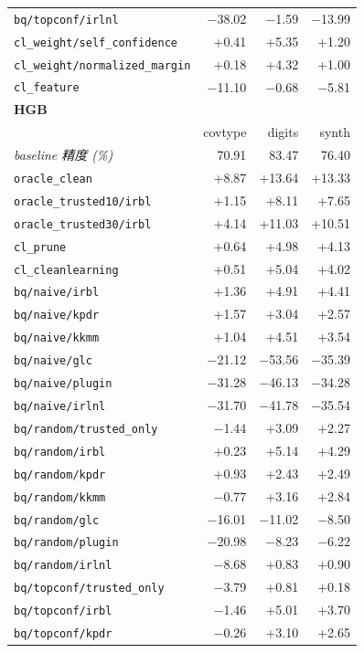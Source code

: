 \begin{tabular}{lrrr}
\texttt{bq/topconf/irlnl} & $-$38.02 & $-$1.59 & $-$13.99 \\
\texttt{cl\_weight/self\_confidence} & +0.41 & +5.35 & +1.20 \\
\texttt{cl\_weight/normalized\_margin} & +0.18 & +4.32 & +1.00 \\
\texttt{cl\_feature} & $-$11.10 & $-$0.68 & $-$5.81 \\
\midrule
\multicolumn{4}{l}{\textbf{HGB}} \\
 & covtype & digits & synth \\
\midrule
\textit{baseline 精度 (\%)} & 70.91 & 83.47 & 76.40 \\
\addlinespace
\texttt{oracle\_clean} & +8.87 & +13.64 & +13.33 \\
\texttt{oracle\_trusted10/irbl} & +1.15 & +8.11 & +7.65 \\
\texttt{oracle\_trusted30/irbl} & +4.14 & +11.03 & +10.51 \\
\texttt{cl\_prune} & +0.64 & +4.98 & +4.13 \\
\texttt{cl\_cleanlearning} & +0.51 & +5.04 & +4.02 \\
\texttt{bq/naive/irbl} & +1.36 & +4.91 & +4.41 \\
\texttt{bq/naive/kpdr} & +1.57 & +3.04 & +2.57 \\
\texttt{bq/naive/kkmm} & +1.04 & +4.51 & +3.54 \\
\texttt{bq/naive/glc} & $-$21.12 & $-$53.56 & $-$35.39 \\
\texttt{bq/naive/plugin} & $-$31.28 & $-$46.13 & $-$34.28 \\
\texttt{bq/naive/irlnl} & $-$31.70 & $-$41.78 & $-$35.54 \\
\texttt{bq/random/trusted\_only} & $-$1.44 & +3.09 & +2.27 \\
\texttt{bq/random/irbl} & +0.23 & +5.14 & +4.29 \\
\texttt{bq/random/kpdr} & +0.93 & +2.43 & +2.49 \\
\texttt{bq/random/kkmm} & $-$0.77 & +3.16 & +2.84 \\
\texttt{bq/random/glc} & $-$16.01 & $-$11.02 & $-$8.50 \\
\texttt{bq/random/plugin} & $-$20.98 & $-$8.23 & $-$6.22 \\
\texttt{bq/random/irlnl} & $-$8.68 & +0.83 & +0.90 \\
\texttt{bq/topconf/trusted\_only} & $-$3.79 & +0.81 & +0.18 \\
\texttt{bq/topconf/irbl} & $-$1.46 & +5.01 & +3.70 \\
\texttt{bq/topconf/kpdr} & $-$0.26 & +3.10 & +2.65 \\

\end{tabular}
